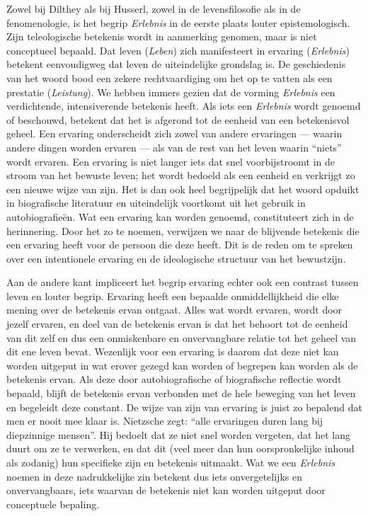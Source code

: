 Zowel bij Dilthey als bij Husserl, zowel in de levensfilosofie als in de fenomenologie, is het begrip \textit{Erlebnis} in de eerste plaats louter epistemologisch. Zijn teleologische betekenis wordt in aanmerking genomen, maar is niet conceptueel bepaald. Dat leven (\textit{Leben}) zich manifesteert in ervaring (\textit{Erlebnis}) betekent eenvoudigweg dat leven de uiteindelijke grondslag is. De geschiedenis van het woord bood een zekere rechtvaardiging om het op te vatten als een prestatie (\textit{Leistung}). We hebben immers gezien dat de vorming \textit{Erlebnis} een verdichtende, intensiverende betekenis heeft. Als iets een \textit{Erlebnis} wordt genoemd of beschouwd, betekent dat het is afgerond tot de eenheid van een betekenisvol geheel. Een ervaring onderscheidt zich zowel van andere ervaringen — waarin andere dingen worden ervaren — als van de rest van het leven waarin ``niets'' wordt ervaren. Een ervaring is niet langer iets dat snel voorbijstroomt in de stroom van het bewuste leven; het wordt bedoeld als een eenheid en verkrijgt zo een nieuwe wijze van zijn. Het is dan ook heel begrijpelijk dat het woord opduikt in biografische literatuur en uiteindelijk voortkomt uit het gebruik in autobiografieën. Wat een ervaring kan worden genoemd, constituteert zich in de herinnering. Door het zo te noemen, verwijzen we naar de blijvende betekenis die een ervaring heeft voor de persoon die deze heeft. Dit is de reden om te spreken over een intentionele ervaring en de ideologische structuur van het bewustzijn.

Aan de andere kant impliceert het begrip ervaring echter ook een contrast tussen leven en louter begrip. Ervaring heeft een bepaalde onmiddellijkheid die elke mening over de betekenis ervan ontgaat. Alles wat wordt ervaren, wordt door jezelf ervaren, en deel van de betekenis ervan is dat het behoort tot de eenheid van dit zelf en dus een onmiskenbare en onvervangbare relatie tot het geheel van dit ene leven bevat. Wezenlijk voor een ervaring is daarom dat deze niet kan worden uitgeput in wat erover gezegd kan worden of begrepen kan worden als de betekenis ervan. Als deze door autobiografische of biografische reflectie wordt bepaald, blijft de betekenis ervan verbonden met de hele beweging van het leven en begeleidt deze constant. De wijze van zijn van ervaring is juist zo bepalend dat men er nooit mee klaar is. Nietzsche zegt: ``alle ervaringen duren lang bij diepzinnige mensen''. Hij bedoelt dat ze niet snel worden vergeten, dat het lang duurt om ze te verwerken, en dat dit (veel meer dan hun oorspronkelijke inhoud als zodanig) hun specifieke zijn en betekenis uitmaakt. Wat we een \textit{Erlebnis} noemen in deze nadrukkelijke zin betekent dus iets onvergetelijks en onvervangbaars, iets waarvan de betekenis niet kan worden uitgeput door conceptuele bepaling.

